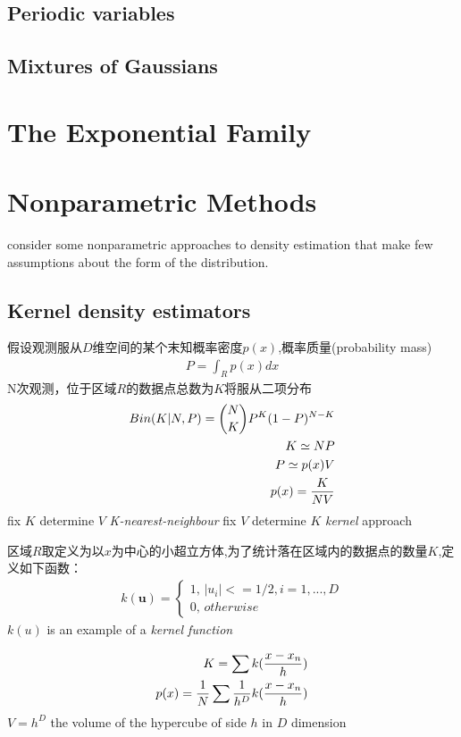 \documentclass[a4paper]{article}
\begin{document}
\subsection{Periodic variables}

\subsection{Mixtures of Gaussians}
\label{sec:2.3.8}

\section{The Exponential Family}
\label{sec:2.4}

\section{Nonparametric Methods}
\label{sec:2.5}
consider some nonparametric approaches to density estimation that make few assumptions about the form of the distribution.

\subsection{Kernel density estimators}
\label{sec:2.5.1}
假设观测服从$D$维空间的某个末知概率密度$p(x)$,概率质量(probability mass)
\begin{align}
  P = \int_R p(x)dx
\end{align}
N次观测，位于区域$R$的数据点总数为$K$将服从二项分布
\begin{align}
  Bin(K|N,P) = {N \choose K} P^K(1-P)^{N-K}\\
  K \simeq NP\\
  P \simeq p(x)V\\
  p(x) = {K \over NV}
\end{align}
ﬁx $K$ determine $V$ \textit{K-nearest-neighbour}
ﬁx $V$ determine $K$ \textit{kernel} approach

区域$R$取定义为以$x$为中心的小超立方体,为了统计落在区域内的数据点的数量$K$,定义如下函数：
\begin{align}
  k(\mathbf{u}) =
  \begin{cases}
    1,\, |u_i| <= 1/2, i = 1,...,D\\
    0,\, otherwise
  \end{cases}
\end{align}
$k(u)$ is an example of a \textit{kernel function}

\begin{align}
  K = \sum k({x-x_n \over h})\\
  p(x) = {1 \over N} \sum {1 \over h^D} k({x-x_n \over h})
\end{align}
$V = h^D$ the volume of the hypercube of side $h$ in $D$ dimension
\end{document}
